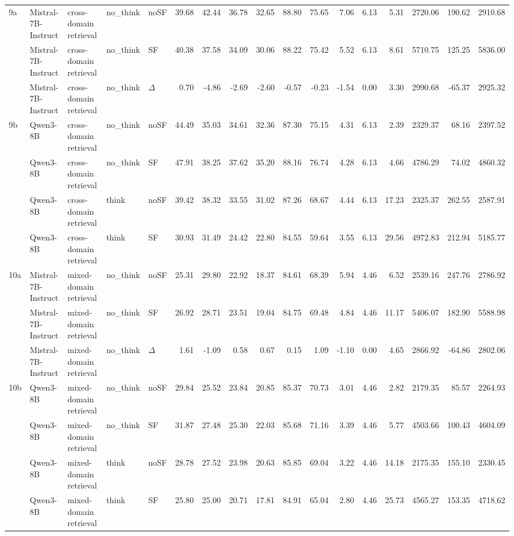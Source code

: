 \begin{landscape}
\begin{footnotesize}
\begin{longtable}{l l l l l r r r r r r r r r r r r}
\midrule
9a & Mistral-7B-Instruct & cross-domain retrieval & no\_think & noSF & 39.68 & 42.44 & 36.78 & 32.65 & 88.80 & 75.65 & 7.06 & 6.13 & 5.31 & 2720.06 & 190.62 & 2910.68 \\
 & Mistral-7B-Instruct & cross-domain retrieval & no\_think & SF & 40.38 & 37.58 & 34.09 & 30.06 & 88.22 & 75.42 & 5.52 & 6.13 & 8.61 & 5710.75 & 125.25 & 5836.00 \\
 & Mistral-7B-Instruct & cross-domain retrieval & no\_think & $\Delta$ & 0.70 & -4.86 & -2.69 & -2.60 & -0.57 & -0.23 & -1.54 & 0.00 & 3.30 & 2990.68 & -65.37 & 2925.32 \\
9b & Qwen3-8B & cross-domain retrieval & no\_think & noSF & 44.49 & 35.03 & 34.61 & 32.36 & 87.30 & 75.15 & 4.31 & 6.13 & 2.39 & 2329.37 & 68.16 & 2397.52 \\
 & Qwen3-8B & cross-domain retrieval & no\_think & SF & 47.91 & 38.25 & 37.62 & 35.20 & 88.16 & 76.74 & 4.28 & 6.13 & 4.66 & 4786.29 & 74.02 & 4860.32 \\
 & Qwen3-8B & cross-domain retrieval & think & noSF & 39.42 & 38.32 & 33.55 & 31.02 & 87.26 & 68.67 & 4.44 & 6.13 & 17.23 & 2325.37 & 262.55 & 2587.91 \\
 & Qwen3-8B & cross-domain retrieval & think & SF & 30.93 & 31.49 & 24.42 & 22.80 & 84.55 & 59.64 & 3.55 & 6.13 & 29.56 & 4972.83 & 212.94 & 5185.77 \\
\midrule
10a & Mistral-7B-Instruct & mixed-domain retrieval & no\_think & noSF & 25.31 & 29.80 & 22.92 & 18.37 & 84.61 & 68.39 & 5.94 & 4.46 & 6.52 & 2539.16 & 247.76 & 2786.92 \\
 & Mistral-7B-Instruct & mixed-domain retrieval & no\_think & SF & 26.92 & 28.71 & 23.51 & 19.04 & 84.75 & 69.48 & 4.84 & 4.46 & 11.17 & 5406.07 & 182.90 & 5588.98 \\
 & Mistral-7B-Instruct & mixed-domain retrieval & no\_think & $\Delta$ & 1.61 & -1.09 & 0.58 & 0.67 & 0.15 & 1.09 & -1.10 & 0.00 & 4.65 & 2866.92 & -64.86 & 2802.06 \\
10b & Qwen3-8B & mixed-domain retrieval & no\_think & noSF & 29.84 & 25.52 & 23.84 & 20.85 & 85.37 & 70.73 & 3.01 & 4.46 & 2.82 & 2179.35 & 85.57 & 2264.93 \\
 & Qwen3-8B & mixed-domain retrieval & no\_think & SF & 31.87 & 27.48 & 25.30 & 22.03 & 85.68 & 71.16 & 3.39 & 4.46 & 5.77 & 4503.66 & 100.43 & 4604.09 \\
 & Qwen3-8B & mixed-domain retrieval & think & noSF & 28.78 & 27.52 & 23.98 & 20.63 & 85.85 & 69.04 & 3.22 & 4.46 & 14.18 & 2175.35 & 155.10 & 2330.45 \\
 & Qwen3-8B & mixed-domain retrieval & think & SF & 25.80 & 25.00 & 20.71 & 17.81 & 84.91 & 65.04 & 2.80 & 4.46 & 25.73 & 4565.27 & 153.35 & 4718.62 \\
\end{longtable}
\end{footnotesize}
\end{landscape}
